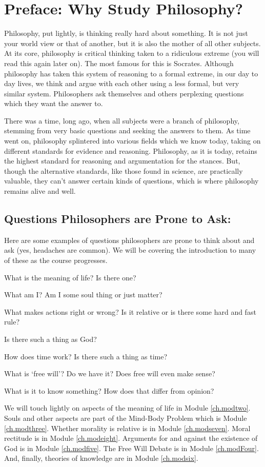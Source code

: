 \chapter{Preface: Why Study Philosophy?}
Philosophy, put lightly, is thinking really hard about something. It is not just your world view or that of another, but it is also the mother of all other subjects. At its core, philosophy is critical thinking taken to a ridiculous extreme (you will read this again later on). The most famous for this is Socrates. Although philosophy has taken this system of reasoning to a formal extreme, in our day to day lives, we think and argue with each other using a less formal, but very similar system. Philosophers ask themselves and others perplexing questions which they want the answer to. 

There was a time, long ago, when all subjects were a branch of philosophy, stemming from very basic questions and seeking the answers to them. As time went on, philosophy splintered into various fields which we know today, taking on different standards for evidence and reasoning. Philosophy, as it is today, retains the highest standard for reasoning and argumentation for the stances. But, though the alternative standards, like those found in science, are practically valuable, they can't answer certain kinds of questions, which is where philosophy remains alive and well.  
\section{Questions Philosophers are Prone to Ask:}

Here are some examples of questions philosophers are prone to think about and ask (yes, headaches are common). We will be covering the introduction to many of these as the course progresses.
\begin{earg}
    \item[]What is the meaning of life? Is there one? 
    \item[]What am I? Am I some soul thing or just matter?
    \item[]What makes actions right or wrong? Is it relative or is there some hard and fast rule?
    \item[]Is there such a thing as God?
    \item[]How does time work? Is there such a thing as time?
    \item[]What is ‘free will’? Do we have it? Does free will even make sense?
    \item[]What is it to know something? How does that differ from opinion?
\end{earg}
We will touch lightly on aspects of the meaning of life in Module \ref{ch.modtwo}. Souls and other aspects are part of the Mind-Body Problem which is Module \ref{ch.modthree}. Whether morality is relative is in Module \ref{ch.modseven}. Moral rectitude is in Module \ref{ch.modeight}. Arguments for and against the existence of God is in Module \ref{ch.modfive}. The Free Will Debate is in Module \ref{ch.modFour}. And, finally, theories of knowledge are in Module \ref{ch.modsix}. 

